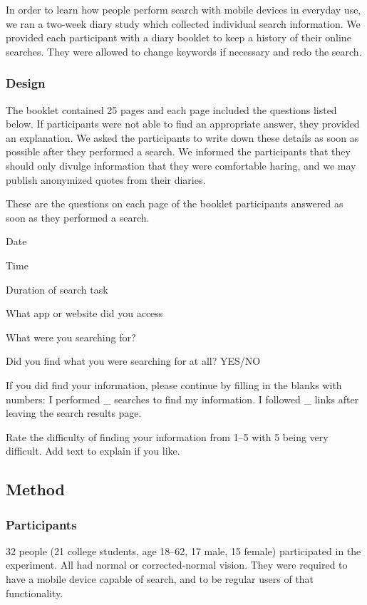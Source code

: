 
In order to learn how people perform search with mobile devices in everyday use, we ran a two-week diary study which collected individual search information. We provided each participant with a diary booklet to keep a history of their online searches. They were allowed to change keywords if necessary and redo the search.

\subsubsection{Design}
The booklet contained 25 pages and each page included the questions listed below. If participants were not able to find an appropriate answer, they provided an explanation. We asked the participants to write down these details as soon as possible after they performed a search. We informed the participants that they should only divulge information that they were comfortable haring, and we may publish anonymized quotes from their diaries. 

These are the questions on each page of the booklet participants answered as soon as they performed a search.
\begin{tight_enumerate}
            \item Date
            \item Time
            \item Duration of search task 
            \item What app or website did you access
            \item What were you searching for?
            \item Did you find what you were searching for at all? YES/NO
            \item If you did find your information, please continue by filling in the blanks with numbers: I performed \_ searches to find my information. I followed \_ links after leaving the search results page.
            \item Rate the difficulty of finding your information from 1--5 with 5 being very difficult. Add text to explain if you like.
\end{tight_enumerate}


\subsection{Method}

\subsubsection{Participants}
32 people (21 college students, age 18--62, 17 male, 15 female) participated in the experiment. All had normal or corrected-normal vision. They were required to have a mobile device capable of search, and to be regular users of that functionality. 

